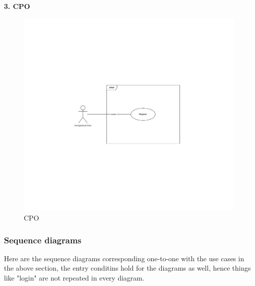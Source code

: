 \documentclass[11pt]{article}
\begin{document}
\begin{description}
    \item \textbf{3. CPO}
    \begin{figure}[!ht]
        \centering
        \includegraphics[page={3}, trim=6.6cm 8.8cm 6.6cm 8.8cm, width=0.8\linewidth, clip]{UseCases.pdf}
        \caption{CPO}
    \end{figure}
\end{description}

\newpage

\subsubsection{Sequence diagrams}

Here are the sequence diagrams corresponding one-to-one with the use cases in the above section, the entry conditins hold for the diagrams as well, hence things like "login" are not repeated in every diagram.
\end{document}
